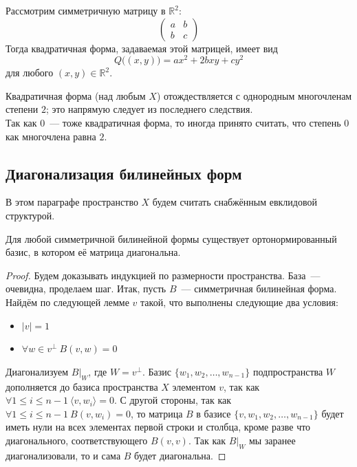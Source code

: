 \documentclass[11pt]{article}
\begin{document}
    \begin{example}
    Рассмотрим симметричную матрицу в $\mathbb{R}^2$:
    \begin{equation*}
        \begin{pmatrix}
        a & b\\
        b & c
        \end{pmatrix}
    \end{equation*}
    Тогда квадратичная форма, задаваемая этой матрицей, имеет вид
    \begin{equation*}
        Q\big((x, y)\big) = ax^2 + 2bxy + cy^2
    \end{equation*}
    для любого $(x, y) \in \mathbb{R}^2$.
    \end{example}

    \begin{remark}
    Квадратичная форма (над любым $X$) отождествляется с однородным многочленам степени $2$; это напрямую следует из последнего следствия. \\
    Так как $0$~--- тоже квадратичная форма, то иногда принято считать, что степень $0$ как многочлена равна $2$.
    \end{remark}

    \subsection{Диагонализация билинейных форм}

    В этом параграфе пространство $X$ будем считать снабжённым евклидовой структурой.

    \begin{theorem}
    Для любой симметричной билинейной формы существует ортонормированный базис, в котором её матрица диагональна.
    \end{theorem}

    \begin{proof}
    Будем доказывать индукцией по размерности пространства. База~--- очевидна, проделаем шаг. Итак, пусть $B$~--- симметричная билинейная форма. Найдём по следующей лемме $v$ такой, что выполнены следующие два условия:
    \begin{itemize}
        \item $|v| = 1$
        \item $\forall w \in v^{\bot} \ B(v, w) = 0$
    \end{itemize}
    Диагонализуем $B|_{W}$, где $W = v^{\bot}$. Базис $\{w_1, w_2, \hdots, w_{n-1}\}$ подпространства $W$ дополняется до базиса пространства $X$ элементом $v$, так как $\forall 1 \leq i \leq n - 1 \ \langle v, w_{i} \rangle = 0$. С другой стороны, так как $\forall 1 \leq i \leq n - 1 \ B(v, w_{i}) = 0$, то матрица $B$ в базисе $\{v, w_1, w_2, \hdots, w_{n-1}\}$ будет иметь нули на всех элементах первой строки и столбца, кроме разве что диагонального, соответствующего $B(v, v)$. Так как $B|_{W}$ мы заранее диагонализовали, то и сама $B$ будет диагональна.
    \end{proof}
\end{document}

